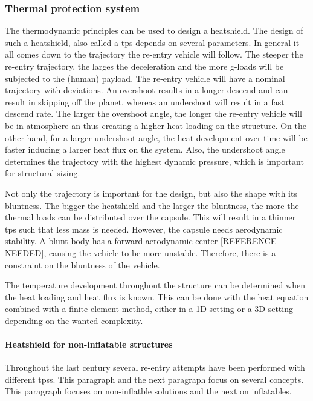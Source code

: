 \subsubsection{Thermal protection system}
The thermodynamic principles can be used to design a heatshield. The design of such a heatshield, also called a \acrfull{tps} depends on several parameters. In general it all comes down to the trajectory the re-entry vehicle will follow. The steeper the re-entry trajectory, the larges the deceleration and the more g-loads will be subjected to the (human) payload. The re-entry vehicle will have a nominal trajectory with deviations. An overshoot results in a longer descend and can result in skipping off the planet, whereas an undershoot will result in a fast descend rate. The larger the overshoot angle, the longer the re-entry vehicle will be in atmosphere an thus creating a higher heat loading on the structure. On the other hand, for a larger undershoot angle, the heat development over time will be faster inducing a larger heat flux on the system. Also, the undershoot angle determines the trajectory with the highest dynamic pressure, which is important for structural sizing. 

Not only the trajectory is important for the design, but also the shape with its bluntness. The bigger the heatshield and the larger the bluntness, the more the  thermal loads can be distributed over the capsule. This will result in a thinner \gls{tps} such that less mass is needed. However, the capsule needs aerodynamic stability. A blunt body has a forward aerodynamic center [REFERENCE NEEDED], causing the vehicle to be more unstable. Therefore, there is a constraint on the bluntness of the vehicle.

The temperature development throughout the structure can be determined when the heat loading and heat flux is known. This can be done with the heat equation combined with a finite element method, either in a 1D setting or a 3D setting depending on the wanted complexity.

\paragraph{Heatshield for non-inflatable structures}
Throughout the last century several re-entry attempts have been performed with different \gls{tps}s. This paragraph and the next paragraph focus on several concepts. This paragraph focuses on non-inflatble solutions and the next on inflatables. 



